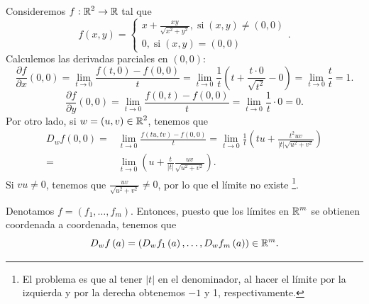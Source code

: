 \begin{eg}
Consideremos $\displaystyle f : \mathbb{R}^{2} \to \mathbb{R} $ tal que 
\[f\left(x,y\right) = 
\begin{cases}
x + \frac{xy}{\sqrt{x^{2}+y^{2}}}, \; \text{si} \; \left(x,y\right) \neq \left(0,0\right) \\
0, \; \text{si}\; \left(x,y\right) = \left(0,0\right)
\end{cases}
.\]
Calculemos las derivadas parciales en $\displaystyle \left(0,0\right) $:
\[\frac{\partial f}{\partial x}\left(0,0\right) = \lim_{t \to 0}\frac{f\left(t,0\right)-f\left(0,0\right)}{t} = \lim_{t \to 0}\frac{1}{t}\left(t + \frac{t \cdot 0}{\sqrt{t^{2}}}-0\right) = \lim_{t \to 0}\frac{t}{t} = 1 .\]
\[\frac{\partial f}{\partial y}\left(0,0\right) = \lim_{t \to 0}\frac{f\left(0,t\right)-f\left(0,0\right)}{t} = \lim_{t \to 0}\frac{1}{t} \cdot 0 = 0 .\]
Por otro lado, si $\displaystyle w = \left(u,v\right) \in \mathbb{R}^{2} $, tenemos que 
\[
\begin{split}
	D_{w}f\left(0,0\right) = & \lim_{t \to 0}\frac{f\left(tu,tv\right)-f\left(0,0\right)}{t} = \lim_{t \to 0}\frac{1}{t}\left(tu + \frac{t^{2}uv}{ \left|t\right|\sqrt{u^{2}+v^{2}}}\right) \\
	= &  \lim_{t \to 0}\left(u + \frac{t}{ \left|t\right|} \frac{uv}{\sqrt{u^{2}+v^{2}}}\right).
\end{split}
\]
Si $\displaystyle vu \neq 0 $, tenemos que $\displaystyle \frac{uv}{\sqrt{u^{2}+v^{2}}}\neq 0 $, por lo que el límite no existe \footnote{El problema es que al tener $\displaystyle \left|t\right| $ en el denominador, al hacer el límite por la izquierda y por la derecha obtenemos $\displaystyle -1 $ y 1, respectivamente.}.
\end{eg}
\begin{observation}
Denotamos $\displaystyle f = \left(f_{1}, \ldots, f_{m}\right) $. Entonces, puesto que los límites en $\displaystyle \mathbb{R}^{m} $ se obtienen  coordenada a coordenada, tenemos que
\[D_{w}f\left(a\right) = \left(D_{w}f_{1}\left(a\right), \ldots, D_{w}f_{m}\left(a\right)\right) \in \mathbb{R}^{m} .\]
\end{observation}
